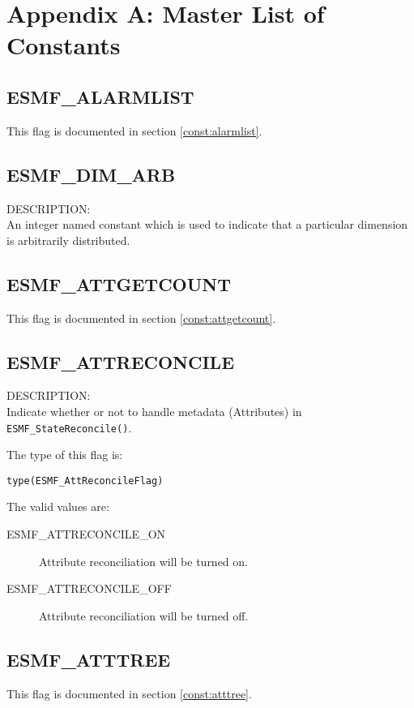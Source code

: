
\section{Appendix A:  Master List of Constants}
\label{const:master}

\subsection{ESMF\_ALARMLIST}
This flag is documented in section \ref{const:alarmlist}.

\subsection{ESMF\_DIM\_ARB}
\label{const:arbdim}

{\sf DESCRIPTION:\\}
An integer named constant which is used to indicate that a particular dimension is arbitrarily distributed.

\subsection{ESMF\_ATTGETCOUNT}
This flag is documented in section \ref{const:attgetcount}.


\subsection{ESMF\_ATTRECONCILE}
\label{const:attreconcile}
{\sf DESCRIPTION:\\}
Indicate whether or not to handle metadata (Attributes) in {\tt ESMF\_StateReconcile()}.

The type of this flag is:

{\tt type(ESMF\_AttReconcileFlag)}

The valid values are:
\begin{description}
	\item[ESMF\_ATTRECONCILE\_ON]
	Attribute reconciliation will be turned on.
	\item[ESMF\_ATTRECONCILE\_OFF]
	Attribute reconciliation will be turned off.
\end{description}


\subsection{ESMF\_ATTTREE}
This flag is documented in section \ref{const:atttree}.


